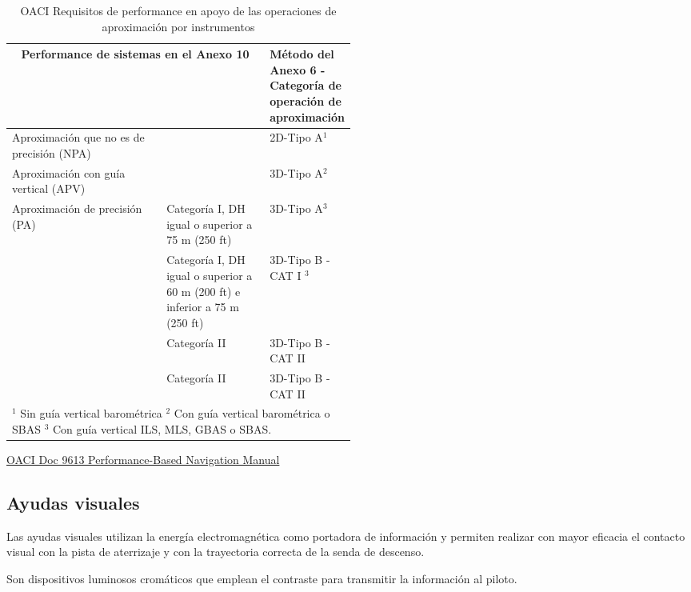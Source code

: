 \begin{table}[!htb]
  \centering
  \caption[06.OACI.requisitos.]{OACI Requisitos de performance en apoyo de las operaciones de aproximación por instrumentos}
  \label{tab:06.OACI.requisitos}

  \begin{tabular}{lm{0.3\linewidth}m{0.2\linewidth}} \hline 
    \multicolumn{2}{c}{Performance de sistemas en el Anexo 10}
    & {Método del Anexo 6 - Categoría de operación de aproximación}
    \\ \hline 
    Aproximación que no es de precisión (NPA)
    &
    &2D-Tipo A$^1$
    \\ \hline
    Aproximación con guía vertical (APV)
    &
    &3D-Tipo A$^2$
    \\ \hline
    Aproximación de precisión (PA)
    & Categoría I, DH igual o superior a 75 m (250 ft)
    &3D-Tipo A$^3$ \\ \cline{2-3}
    & Categoría I, DH igual o superior a 60 m (200
      ft) e inferior a 75 m (250 ft)
    & 3D-Tipo B - CAT I $^3$ \\ \cline{2-3}
    & Categoría II
    & 3D-Tipo B - CAT II \\ \cline{2-3}
    & Categoría II
    & 3D-Tipo B - CAT II \\  \hline
    \multicolumn{3}{l}{\footnotesize
    \parbox{\linewidth}{
        $^1$ Sin  guía vertical barométrica \\
    $^2$ Con guía vertical barométrica o SBAS \\
    $^3$ Con guía vertical ILS, MLS, GBAS o SBAS.
    }	
    } \\
  \end{tabular}
\end{table}

\href{https://skybrary.aero/sites/default/files/bookshelf/2991.pdf}{OACI Doc 9613
  Performance-Based Navigation Manual}


\subsection{Ayudas visuales}
\label{sec:06.02.ayudasvisuales}


Las ayudas visuales utilizan la energía electromagnética como portadora de información y permiten
realizar con mayor eficacia el contacto visual con la pista de aterrizaje y con la trayectoria
correcta de la senda de descenso.

Son dispositivos luminosos cromáticos que emplean el contraste para
transmitir la información al piloto.

